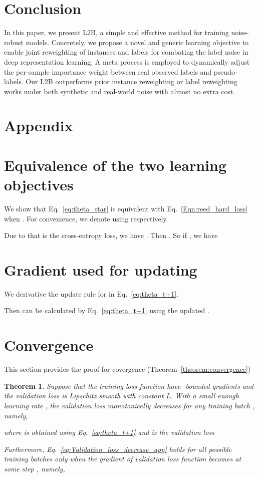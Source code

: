 \documentclass{article}
\newtheorem*{theorem*}{Theorem}
\begin{document}
\section{Conclusion}
In this paper, we present L2B, a simple and effective method for training noise-robust models. 
Concretely, we propose a novel and generic learning objective to enable joint reweighting of instances and labels for combating the label noise in deep representation learning. A meta process is employed to dynamically adjust the per-sample importance weight between real observed labels and pseudo-labels.
Our L2B outperforms prior instance reweighting or label reweighting works under both synthetic and real-world noise with almost no extra cost. 






\clearpage
\appendix

\section*{Appendix}

\section{Equivalence of the two learning objectives}
We show that Eq.~\eqref{eq:theta_star} is equivalent with Eq.~\eqref{Eqn:reed_hard_loss} when . For convenience, we denote  using  respectively. 

Due to that  is the cross-entropy loss, we have . Then . So if , we have 


\section{Gradient used for updating }
We derivative the update rule for  in Eq.~\eqref{eq:theta_t+1}. 




Then  can be calculated by Eq.~\eqref{eq:theta_t+1} using the updated . 
\section{Convergence}
This section provides the proof for covergence (Theorem~\ref{theorem:convergence})

\begin{theorem*}
Suppose that the training loss function  have -bounded gradients and the validation loss  is Lipschitz smooth with constant L. With a small enough learning rate , the validation loss monotonically decreases for any training batch , namely, 

where  is obtained using Eq.~\eqref{eq:theta_t+1} and  is the validation loss


Furthermore, Eq.~\eqref{eq:Validation_loss_decrease_app} holds for all possible training batches only when the gradient of validation loss function becomes  at some step , namely, 
\end{theorem*}
\end{document}
